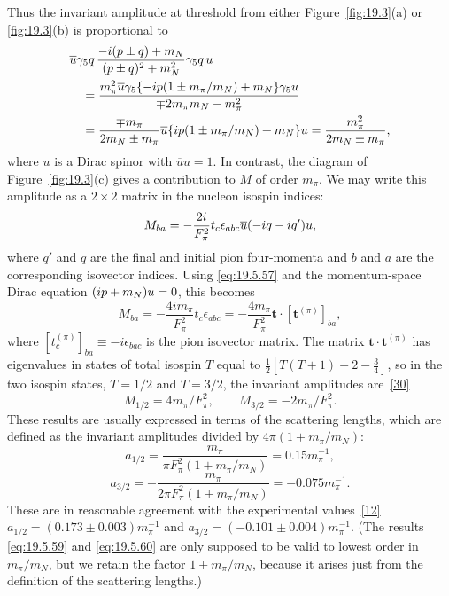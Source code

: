 Thus the invariant amplitude at threshold from either Figure~\ref{fig:19.3}(a) or \ref{fig:19.3}(b) is proportional to
\begin{align*}
&\overline u\gamma_5\sl{q}\,
\frac{-i(\sl{p}\mathbin{\pm}\sl{q})+m_N}
{(p\mathbin{\pm}q)^2+m_N^2}
\gamma_5\sl{q}\,u
\\
&\quad=
\frac{m_\pi^2\overline u\gamma_5
\{-i\sl{p}(1\mathbin{\pm}m_\pi/m_N)+m_N\}
\gamma_5u}
{\mp2m_\pi m_N-m_\pi^2}
\\
&\quad=
\frac{\mp m_\pi}{2m_N\mathbin{\pm}m_\pi}
\overline u\{i\sl{p}(1\mathbin{\pm}m_\pi/m_N)+m_N\}u
=\frac{m_\pi^2}{2m_N\mathbin{\pm}m_\pi},
\end{align*}
where $u$ is a Dirac spinor with $\overline uu=1$. In contrast, the diagram of Figure~\ref{fig:19.3}(c) gives a contribution to $M$ of order $m_\pi$. We may write this amplitude as a $2\times2$ matrix in the nucleon isospin indices:
\[
M_{ba}
=-\frac{2i}{F_\pi^2}t_c\epsilon_{abc}
\overline u(-i\sl{q}-i\sl{q}')u,
\]
where $q'$ and $q$ are the final and initial pion four-momenta and $b$ and $a$ are the corresponding isovector indices. Using \eqref{eq:19.5.57} and the momentum-space Dirac equation $(i\sl{p}+m_N)u=0$, this becomes
\begin{equation}
M_{ba}
=-\frac{4im_\pi}{F_\pi^2}t_c\epsilon_{abc}
=-\frac{4m_\pi}{F_\pi^2}
\boldsymbol t\cdot[\boldsymbol t^{(\pi)}]_{ba},
\tag{19.5.58}\label{eq:19.5.58}
\end{equation}
where $[t_c^{(\pi)}]_{ba}\equiv-i\epsilon_{bac}$ is the pion isovector matrix. The matrix $\boldsymbol t\cdot\boldsymbol t^{(\pi)}$ has eigenvalues in states of total isospin $T$ equal to $\tfrac12[T(T+1)-2-\tfrac34]$, so in the two isospin states, $T=1/2$ and $T=3/2$, the invariant amplitudes are~\hyperref[ch19-ref-30]{[30]}
\[
M_{1/2}=4m_\pi/F_\pi^2,
\qquad
M_{3/2}=-2m_\pi/F_\pi^2.
\]
These results are usually expressed in terms of the scattering lengths, which are defined as the invariant amplitudes divided by $4\pi(1+m_\pi/m_N)$:
\begin{equation}
a_{1/2}
=\frac{m_\pi}{\pi F_\pi^2(1+m_\pi/m_N)}
=0.15m_\pi^{-1},
\tag{19.5.59}\label{eq:19.5.59}
\end{equation}
\begin{equation}
a_{3/2}
=-\frac{m_\pi}{2\pi F_\pi^2(1+m_\pi/m_N)}
=-0.075m_\pi^{-1}.
\tag{19.5.60}\label{eq:19.5.60}
\end{equation}
These are in reasonable agreement with the experimental values~\hyperref[ch19-ref-12]{[12]} $a_{1/2}=(0.173\mathbin{\pm}0.003)m_\pi^{-1}$ and $a_{3/2}=(-0.101\mathbin{\pm}0.004)m_\pi^{-1}$. (The results \eqref{eq:19.5.59} and \eqref{eq:19.5.60} are only supposed to be valid to lowest order in $m_\pi/m_N$, but we retain the factor $1+m_\pi/m_N$, because it arises just from the definition of the scattering lengths.)

